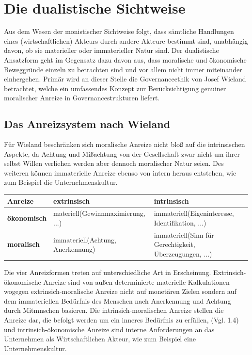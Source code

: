 \documentclass[12pt]{article}
\begin{document}
\section{Die dualistische Sichtweise}
Aus dem Wesen der monistischer Sichtweise folgt, dass sämtliche Handlungen eines (wirtschaftlichen) Akteurs durch andere Akteure bestimmt sind, unabhängig davon, ob sie materieller oder immaterieller Natur sind. Der dualistische Ansatzform geht im Gegensatz dazu davon aus, dass moralische und ökonomische Beweggründe einzeln zu betrachten sind und vor allem nicht immer miteinander einhergehen. Primär wird an dieser Stelle die Governanceethik von Josef Wieland betrachtet, welche ein umfassendes Konzept zur Berücksichtigung genuiner moralischer Anreize in Governancestrukturen liefert.
\subsection{Das Anreizsystem nach Wieland}
Für Wieland beschränken sich moralische Anreize nicht bloß auf die intrinsischen Aspekte, da Achtung und Mißachtung von der Gesellschaft zwar nicht um ihrer selbst Willen verliehen werden aber dennoch moralischer Natur seien. Des weiteren können immaterielle Anreize ebenso von intern heraus entstehen, wie zum Beispiel die Unternehmenskultur.
\begin{center}
\begin{tabular}{|p{3cm}|p{5cm}|p{5cm}|}
\hline
Anreize & \textbf{extrinsisch} & \textbf{intrinsisch}\\\hline
\textbf{ökonomisch} & materiell\newline(Gewinnmaximierung, ...) & immateriell\newline (Eigeninteresse, Identifikation, ...)\\\hline
\textbf{moralisch} & immateriell\newline (Achtung, Anerkennung) & immateriell\newline(Sinn für Gerechtigkeit, Überzeugungen, ...)\\\hline
\end{tabular}
\end{center}
Die vier Anreizformen treten auf unterschiedliche Art in Erscheinung. Extrinsich-ökonomische Anreize sind von außen determinierte materielle Kalkulationen wogegen extrinsich-moralische Anreize nicht auf monetären Zielen sondern auf dem immateriellen Bedürfnis des Menschen nach Anerkennung und Achtung durch Mitmnschen basieren. Die intrinsich-moralischen Anreize stellen die Anreize dar, die befolgt werden um ein inneres Bedürfnis zu erfüllen, (Vgl. 1.4) und intrinsich-ökonomische Anreize sind interne Anforderungen an das Unternehmen als Wirtschaftlichen Akteur, wie zum Beispiel eine Unternehmenskultur.
\end{document}
